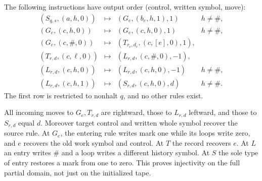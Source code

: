 The following instructions have output order (control, written symbol, move):
\[
\begin{array}{rcll}
 (S_{q,s},(a,h,0))&\mapsto&(G_e,(b_e,h,1),1)&h\ne\#,\\
 (G_e,(c,h,0))&\mapsto&(G_e,(c,h,0),1)&h\ne\#,\\
 (G_e,(c,\#,0))&\mapsto&(T_{r_e,d_e},(c,[e],0),1),\\
 (T_{r,d},(c,\ell,0))&\mapsto&(L_{r,d},(c,\#,0),-1),\\
 (L_{r,d},(c,h,0))&\mapsto&(L_{r,d},(c,h,0),-1)&h\ne\#,\\
 (L_{r,d},(c,h,1))&\mapsto&(S_{r,d},(c,h,0),d)&h\ne\#.
\end{array}
\]
The first row is restricted to nonhalt $q$, and no other rules exist.

All incoming moves to $G_e,T_{r,d}$ are rightward, those to $L_{r,d}$
leftward, and those to $S_{r,d}$ equal $d$.  Moreover target control and
written whole symbol recover the source rule.  At $G_e$, the entering
rule writes mark one while its loops write zero, and $e$ recovers the
old work symbol and control.  At $T$ the record recovers $e$.  At $L$
an entry writes $\#$ and a loop writes a different history symbol.
At $S$ the sole type of entry restores a mark from one to zero.
This proves injectivity on the full partial domain, not just on the
initialized tape.

